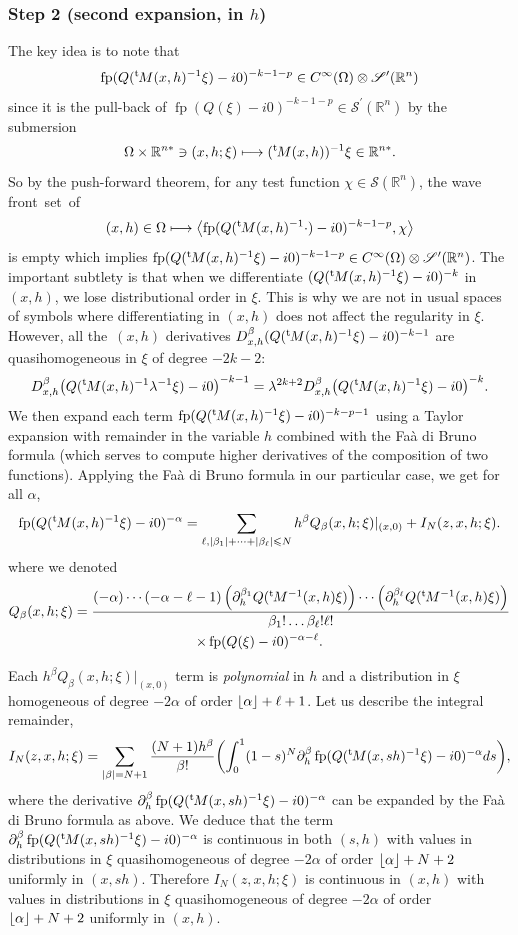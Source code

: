 \documentclass[JEP,XML,SOM,Unicode]{cedram}
\let\pazocal\mathscr
\def\mto{\mathchoice{\longmapsto}{\mapsto}{\mapsto}{\mapsto}}
\theoremstyle{definition}
\let\cv\alpha
\let\Re\relax
\DeclareMathOperator{\Re}{Re}
\DeclareMathOperator*{\pf}{fp}
\newcommand{\plancher}[1]{\left \lfloor #1 \right \rfloor }
\newcommand{\step}[1]{\subsubsection*{Step #1}}
\renewcommand{\t}{{{}^{\mathrm{t}\mkern-2mu}}}
\begin{document}
\step{2 (second expansion, in $h$)}
The key idea is to note that
\[
\pf(Q(\t M(x, h)^{-1}\xi)-i0)^{-k-1-p}\in C^\infty(\Omega)\otimes \pazocal{S}^\prime(\mathbb{R}^n)
\]
since it is the pull-back of $\pf(Q(\xi)-i0)^{-k-1-p}\in \pazocal{S}^\prime(\mathbb{R}^n)$ by the submersion
\[
\Omega\times \mathbb{R}^{n*} \ni (x,h;\xi) \mto (\t M(x,h))^{-1}\xi\in \mathbb{R}^{n*}.
\]
So by the push-forward theorem, for any test function $\chi\!\in\! \pazocal{S}(\mathbb{R}^n)$, the wave front~set~of
\[
(x,h)\in \Omega\mto \left\langle \pf(Q(\t M(x, h)^{-1}\cdot)-i0)^{-k-1-p},\chi\right\rangle
\]
is empty which implies $\pf(Q(\t M(x, h)^{-1}\xi)-i0)^{-k-1-p}\in C^\infty(\Omega)\otimes \pazocal{S}^\prime(\mathbb{R}^n)$.
The important subtlety is that when we differentiate $(Q(\t M(x,h)^{-1}\xi)-i0)^{-k} $ in $(x,h)$, we lose
distributional order in $\xi$. This is why we are not in usual spaces of symbols where differentiating in $(x,h)$ does not affect the regularity in $\xi$. However, all the~$(x,h)$ derivatives $D_{x,h}^\beta(Q(\t M(x,h)^{-1}\xi)-i0)^{-k-1} $ are quasihomogeneous in $\xi$ of degree \hbox{$-2k-2$}:
\[
D_{x,h}^\beta\big(Q(\t M(x,h)^{-1}\lambda^{-1}\xi)-i0\big)^{-k-1}=\lambda^{2k+2}D_{x,h}^\beta\big(Q(\t M(x,h)^{-1}\xi)-i0\big)^{-k}.
\]
We then expand each term
$\pf(Q(\t M(x, h)^{-1}\xi)-i0)^{-k-p-1}$ using a Taylor expansion with remainder in the variable $h$ combined with the Faà di Bruno formula (which serves to compute higher derivatives of the composition of two functions). {Applying the Faà di Bruno formula in our particular case, we get} for all $\cv$,
\[
\pf(Q(\t M(x, h)^{-1}\xi)-i0)^{-\cv} =\sum_{\ell, \vert \beta_1\vert+\dots+\vert\beta_\ell\vert\leqslant N} h^\beta Q_\beta(x,h;\xi)
|_{(x,0)}+I_N(z,x,h;\xi).
\]
where we denoted
\begin{multline*}
Q_\beta(x,h;\xi) = \frac{(-\cv)\cdots(-\cv-\ell-1) \left(\partial_h^{\beta_1}Q(\t M^{-1}(x,h)\xi)\right)\cdots
\left(\partial_h^{\beta_\ell}Q(\t M^{-1}(x,h)\xi)\right) }{\beta_1!\dots\beta_\ell!\ell!}
\\ \times \pf(Q(\xi)-i0)^{-\cv-\ell}.
\end{multline*}

Each $h^\beta Q_\beta(x,h;\xi) |_{(x,0)}$
term is \emph{polynomial} in $h$ and a distribution in $\xi$ homogeneous of degree $-2\cv$ of order $\plancher{\Re\cv}+\ell+1$.
Let us describe the integral remainder,
\[
I_N(z,x,h;\xi)= \sum_{\vert\beta\vert=N+1} \frac{(N+1)h^\beta}{\beta !} \biggl(\int_0^1 (1-s)^{N}\partial^\beta_h\pf(Q(\t M(x,sh)^{-1}\xi)-i0)^{-\cv}ds\biggr),
\]
where the derivative
$\partial^\beta_h\pf(Q(\t M(x,sh)^{-1}\xi)-i0)^{-\cv}$ can be expanded by the Faà di Bruno formula as above.
We deduce that the term $\partial^\beta_h\pf(Q(\t M(x,sh)^{-1}\xi)-i0)^{-\cv}$
is continuous in both $(s,h)$ with values in distributions in $\xi$ quasihomogeneous of degree $-2\cv$
of order $\plancher{\Re\cv}+N+2$ uniformly in $(x,sh)$. Therefore
$I_N(z,x,h;\xi)$ is continuous in $(x,h)$ with values in distributions in $\xi$ quasihomogeneous of degree $-2\cv$
of order $\plancher{\Re\cv}+N+2$ uniformly in $(x,h)$.
\end{document}
